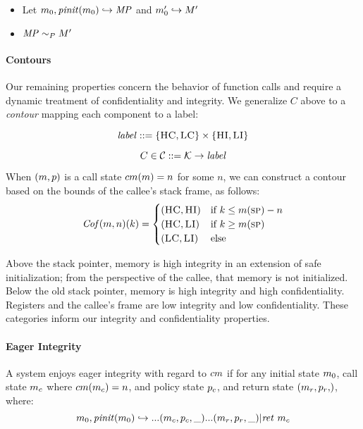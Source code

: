 \documentclass[conference]{IEEEtran}
\begin{document}
      \begin{itemize}
        \item Let \(m_0,\mathit{pinit}(m_0) \hookrightarrow \mathit{MP}\) and \(m_0' \hookrightarrow M'\)
        \item \(\mathit{MP} \sim_P M'\)
      \end{itemize}

    \paragraph{Contours}

      Our remaining properties concern the behavior of function calls and require a dynamic treatment
      of confidentiality and integrity. We generalize \(C\) above to a {\it contour} mapping each component
      to a label:

      \[\mathit{label} ::= \{\textsc{HC},\textsc{LC}\} \times \{\textsc{HI},\textsc{LI}\}\]

      \[C \in {\mathcal C} ::= {\mathcal K} \rightarrow \mathit{label}\]

      When \((m,p)\) is a call state \(cm(m) = n\) for some \(n\),
      we can construct a contour based on the bounds of the callee's stack frame, as follows:
      \[\mathit{Cof}(m,n)(k) =
      \begin{cases}
        (\textsc{HC},\textsc{HI}) & \text{if } k \leq m(\textsc{sp}) - n \\
        (\textsc{HC},\textsc{LI}) & \text{if } k \geq m(\textsc{sp}) \\
        (\textsc{LC},\textsc{LI}) & \text{else} \\
      \end{cases}\]

      Above the stack pointer, memory is high integrity in an extension of safe initialization;
      from the perspective of the callee, that memory is not initialized. Below the old stack
      pointer, memory is high integrity and high confidentiality. Registers and the callee's frame
      are low integrity and low confidentiality. These categories inform our integrity and
      confidentiality properties.

    \paragraph{Eager Integrity}

      A system enjoys eager integrity with regard to \(cm\) if for any initial state \(m_0\),
      call state \(m_c\) where \(cm(m_c) = n\), and policy state \(p_c\), and
      return state \(\mpstate{\mach_r,\pol_r}\), where:
      \[m_0,\mathit{pinit}(m_0) \hookrightarrow ... (m_c,p_c,\_) ...
        (m_r,p_r,\_) | \mathit{ret}\ m_c\]
\end{document}
